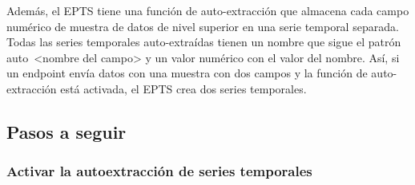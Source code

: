 Además, el EPTS tiene una función de auto-extracción que almacena cada campo numérico de muestra de datos de nivel superior en una serie temporal separada. Todas las series temporales auto-extraídas tienen un nombre que sigue el patrón auto~<nombre del campo> y un valor numérico con el valor del nombre. Así, si un endpoint envía datos con una muestra con dos campos y la función de auto-extracción está activada, el EPTS crea dos series temporales.

\subsection{Pasos a seguir}

\subsubsection{Activar la autoextracción de series temporales}


